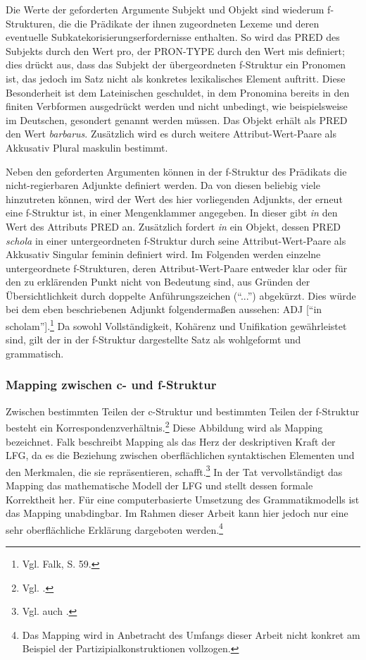 \documentclass[12pt,a4paper]{article}
\begin{document}
Die Werte der geforderten Argumente Subjekt und Objekt sind wiederum f-Strukturen, die die Prädikate der ihnen zugeordneten Lexeme und deren eventuelle Subkatekorisierungserfordernisse enthalten. So wird das PRED des Subjekts durch den Wert pro, der PRON-TYPE durch den Wert mis definiert; dies drückt aus, dass das Subjekt der übergeordneten f-Struktur ein Pronomen ist, das jedoch im Satz nicht als konkretes lexikalisches Element auftritt. Diese Besonderheit ist dem Lateinischen geschuldet, in dem Pronomina bereits in den finiten Verbformen ausgedrückt werden und nicht unbedingt, wie beispielsweise im Deutschen, gesondert genannt werden müssen. Das Objekt erhält als PRED den Wert \textit{barbarus}. Zusätzlich wird es durch weitere Attribut-Wert-Paare als Akkusativ Plural maskulin bestimmt. 

Neben den geforderten Argumenten können in der f-Struktur des Prädikats die nicht-regierbaren Adjunkte definiert werden. Da von diesen beliebig viele hinzutreten können, wird der Wert des hier vorliegenden Adjunkts, der erneut eine f-Struktur ist, in einer Mengenklammer angegeben. In dieser gibt \textit{in} den Wert des Attributs PRED an. Zusätzlich fordert \textit{in} ein Objekt, dessen PRED \textit{schola} in einer untergeordneten f-Struktur durch seine Attribut-Wert-Paare als Akkusativ Singular feminin definiert wird. Im Folgenden werden einzelne untergeordnete f-Strukturen, deren Attribut-Wert-Paare entweder klar oder für den zu erklärenden Punkt nicht von Bedeutung sind, aus Gründen der Übersichtlichkeit durch doppelte Anführungszeichen (``...'') abgekürzt. Dies würde bei dem eben beschriebenen Adjunkt folgendermaßen aussehen: ADJ [“in scholam”].\footnote{Vgl. Falk, S. 59.}
Da sowohl Vollständigkeit, Kohärenz und Unifikation gewährleistet sind, gilt der in der f-Struktur dargestellte Satz als wohlgeformt und grammatisch.

\subsubsection{Mapping zwischen c- und f-Struktur}
Zwischen bestimmten Teilen der c-Struktur und bestimmten Teilen der f-Struktur besteht ein Korrespondenzverhältnis.\footnote{Vgl. \cite[8]{Skript}.} Diese Abbildung wird als Mapping bezeichnet. Falk beschreibt Mapping als das Herz der deskriptiven Kraft der LFG, da es die Beziehung zwischen oberflächlichen syntaktischen Elementen und den Merkmalen, die sie repräsentieren, schafft.\footnote{Vgl. auch \cite[62; 68]{Falk}.} In der Tat vervollständigt das Mapping das mathematische Modell der LFG und stellt dessen formale Korrektheit her. Für eine computerbasierte Umsetzung des Grammatikmodells ist das Mapping unabdingbar. Im Rahmen dieser Arbeit kann hier jedoch nur eine sehr oberflächliche Erklärung dargeboten werden.\footnote{Das Mapping wird in Anbetracht des Umfangs dieser Arbeit nicht konkret am Beispiel der Partizipialkonstruktionen vollzogen.}
\end{document}
